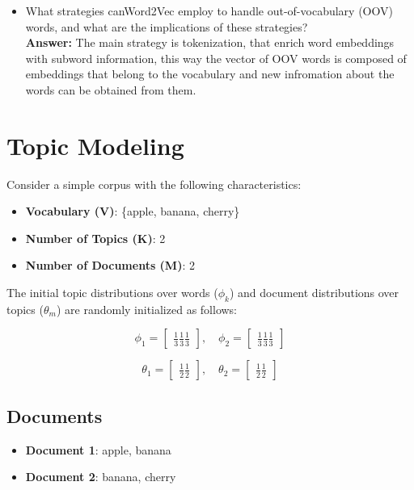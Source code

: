 \documentclass{article}
\begin{document}
\begin{itemize}
		\item What strategies canWord2Vec employ to handle out-of-vocabulary (OOV)
words, and what are the implications of these strategies?\\
\textbf{Answer:} The main strategy is tokenization, that enrich word embeddings with subword information, this way the vector of OOV words is composed of embeddings that belong to the vocabulary and new infromation about the words can be obtained from them.
	\end{itemize}

\newpage
\section { Topic Modeling }
Consider a simple corpus with the following characteristics:

\begin{itemize}
    \item \textbf{Vocabulary (V)}: \{apple, banana, cherry\}
    \item \textbf{Number of Topics (K)}: 2
    \item \textbf{Number of Documents (M)}: 2
\end{itemize}

The initial topic distributions over words ($\phi_k$) and document distributions over topics ($\theta_m$) are randomly initialized as follows:

\[
\phi_1 =
\begin{bmatrix}
\frac{1}{3} \frac{1}{3} \frac{1}{3}
\end{bmatrix}, \quad
\phi_2 =
\begin{bmatrix}
\frac{1}{3} \frac{1}{3} \frac{1}{3}
\end{bmatrix}
\]

\[
\theta_1 =
\begin{bmatrix}
\frac{1}{2}  \frac{1}{2}
\end{bmatrix}, \quad
\theta_2 =
\begin{bmatrix}
\frac{1}{2} \frac{1}{2}
\end{bmatrix}
\]

\subsection*{Documents}
\begin{itemize}
    \item \textbf{Document 1}: apple, banana
    \item \textbf{Document 2}: banana, cherry
\end{itemize}
\end{document}
